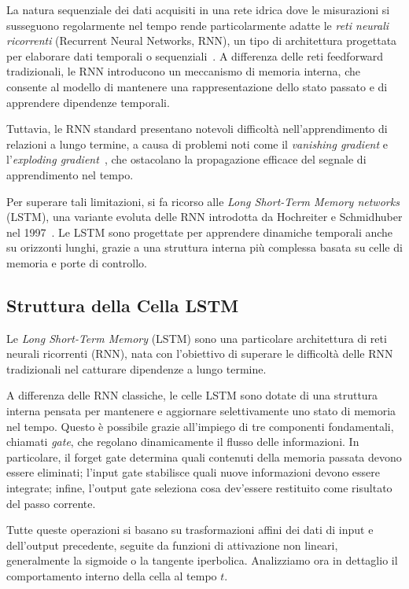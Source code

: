 \documentclass{article}
\begin{document}
La natura sequenziale dei dati acquisiti in una rete idrica dove le misurazioni si susseguono 
regolarmente nel tempo rende particolarmente adatte le \emph{reti neurali ricorrenti} (Recurrent 
Neural Networks, RNN), un tipo di architettura progettata per elaborare dati temporali o 
sequenziali~\cite{elman1990finding}. A differenza delle reti feedforward tradizionali, le RNN 
introducono un meccanismo di memoria interna, che consente al modello di mantenere una rappresentazione 
dello stato passato e di apprendere dipendenze temporali.

Tuttavia, le RNN standard presentano notevoli difficoltà nell’apprendimento di relazioni a lungo 
termine, a causa di problemi noti come il \emph{vanishing gradient} e 
l’\emph{exploding gradient}~\cite{bengio1994learning}, che ostacolano la propagazione efficace del 
segnale di apprendimento nel tempo.

Per superare tali limitazioni, si fa ricorso alle \emph{Long Short-Term Memory networks} (LSTM), una 
variante evoluta delle RNN introdotta da Hochreiter e Schmidhuber nel 1997~\cite{hochreiter1997long}. 
Le LSTM sono progettate per apprendere dinamiche temporali anche su orizzonti lunghi, grazie a una 
struttura interna più complessa basata su celle di memoria e porte di controllo.

\subsection{Struttura della Cella LSTM}

Le \textit{Long Short-Term Memory} (LSTM) sono una particolare architettura di reti neurali ricorrenti 
(RNN), nata con l’obiettivo di superare le difficoltà delle RNN tradizionali nel catturare dipendenze a 
lungo termine.

A differenza delle RNN classiche, le celle LSTM sono dotate di una struttura interna pensata per 
mantenere e aggiornare selettivamente uno stato di memoria nel tempo. Questo è possibile grazie 
all’impiego di tre componenti fondamentali, chiamati \textit{gate}, che regolano dinamicamente il flusso 
delle informazioni. In particolare, il forget gate determina quali contenuti della memoria passata 
devono essere eliminati; l’input gate stabilisce quali nuove informazioni devono essere integrate; 
infine, l’output gate seleziona cosa dev’essere restituito come risultato del passo corrente.

Tutte queste operazioni si basano su trasformazioni affini dei dati di input e dell’output precedente, 
seguite da funzioni di attivazione non lineari, generalmente la sigmoide o la tangente iperbolica. 
Analizziamo ora in dettaglio il comportamento interno della cella al tempo $t$.
\end{document}
